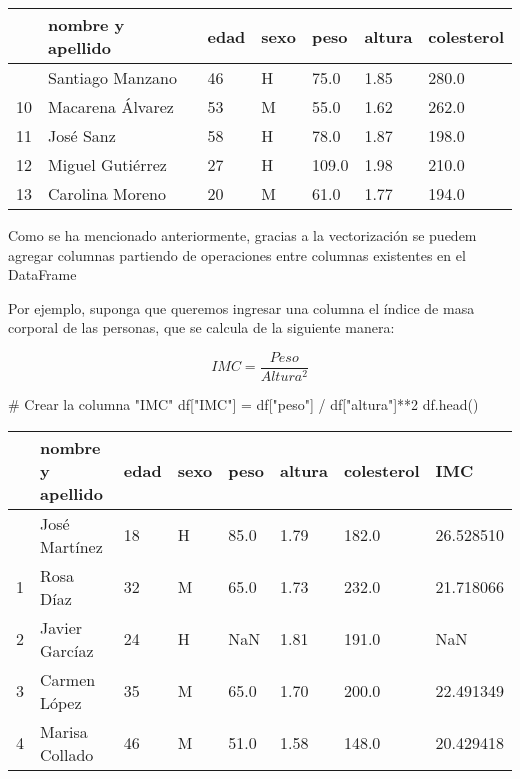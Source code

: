 \documentclass[
  letterpaper,
  DIV=11,
  numbers=noendperiod]{scrreprt}
\newenvironment{Shaded}{\begin{snugshade}}{\end{snugshade}}
\newcommand{\CommentTok}[1]{\textcolor[rgb]{0.37,0.37,0.37}{#1}}
\newcommand{\DecValTok}[1]{\textcolor[rgb]{0.68,0.00,0.00}{#1}}
\newcommand{\NormalTok}[1]{\textcolor[rgb]{0.00,0.23,0.31}{#1}}
\newcommand{\OperatorTok}[1]{\textcolor[rgb]{0.37,0.37,0.37}{#1}}
\newcommand{\StringTok}[1]{\textcolor[rgb]{0.13,0.47,0.30}{#1}}
\begin{document}
\begin{longtable}[]{@{}lllllll@{}}
\toprule\noalign{}
& nombre y apellido & edad & sexo & peso & altura & colesterol \\
\midrule\noalign{}
\endhead
\bottomrule\noalign{}
\endlastfoot
9 & Santiago Manzano & 46 & H & 75.0 & 1.85 & 280.0 \\
10 & Macarena Álvarez & 53 & M & 55.0 & 1.62 & 262.0 \\
11 & José Sanz & 58 & H & 78.0 & 1.87 & 198.0 \\
12 & Miguel Gutiérrez & 27 & H & 109.0 & 1.98 & 210.0 \\
13 & Carolina Moreno & 20 & M & 61.0 & 1.77 & 194.0 \\
\end{longtable}

\begin{tcolorbox}[enhanced jigsaw, colframe=quarto-callout-tip-color-frame, leftrule=.75mm, titlerule=0mm, left=2mm, bottomtitle=1mm, arc=.35mm, opacitybacktitle=0.6, toptitle=1mm, colbacktitle=quarto-callout-tip-color!10!white, opacityback=0, breakable, title=\textcolor{quarto-callout-tip-color}{\faLightbulb}\hspace{0.5em}{\textbf{Agregar columnas con operaciones}}, toprule=.15mm, rightrule=.15mm, colback=white, coltitle=black, bottomrule=.15mm]

Como se ha mencionado anteriormente, gracias a la vectorización se
puedem agregar columnas partiendo de operaciones entre columnas
existentes en el DataFrame

\end{tcolorbox}

Por ejemplo, suponga que queremos ingresar una columna el índice de masa
corporal de las personas, que se calcula de la siguiente manera:

\[
IMC = \frac{Peso}{Altura^2}\]

\begin{Shaded}
\begin{Highlighting}[]
\CommentTok{\# Crear la columna "IMC"}
\NormalTok{df[}\StringTok{"IMC"}\NormalTok{] }\OperatorTok{=}\NormalTok{ df[}\StringTok{"peso"}\NormalTok{] }\OperatorTok{/}\NormalTok{ df[}\StringTok{"altura"}\NormalTok{]}\OperatorTok{**}\DecValTok{2}
\NormalTok{df.head()}
\end{Highlighting}
\end{Shaded}

\begin{longtable}[]{@{}llllllll@{}}
\toprule\noalign{}
& nombre y apellido & edad & sexo & peso & altura & colesterol & IMC \\
\midrule\noalign{}
\endhead
\bottomrule\noalign{}
\endlastfoot
0 & José Martínez & 18 & H & 85.0 & 1.79 & 182.0 & 26.528510 \\
1 & Rosa Díaz & 32 & M & 65.0 & 1.73 & 232.0 & 21.718066 \\
2 & Javier Garcíaz & 24 & H & NaN & 1.81 & 191.0 & NaN \\
3 & Carmen López & 35 & M & 65.0 & 1.70 & 200.0 & 22.491349 \\
4 & Marisa Collado & 46 & M & 51.0 & 1.58 & 148.0 & 20.429418 \\
\end{longtable}
\end{document}
